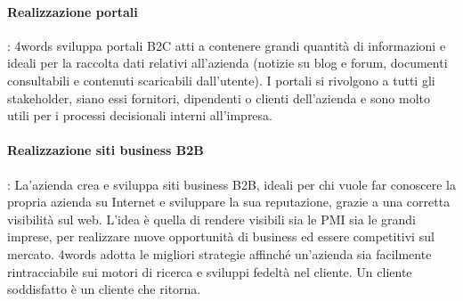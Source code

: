 \paragraph{Realizzazione portali}: 4words sviluppa portali B2C atti a contenere grandi quantità di informazioni e ideali per la raccolta dati relativi all'azienda (notizie su blog e forum, documenti consultabili e contenuti scaricabili dall'utente). I portali si rivolgono a tutti gli \gls{stakeholder}, siano essi fornitori, dipendenti o clienti dell'azienda e sono molto utili per i processi decisionali interni all'impresa.

\paragraph{Realizzazione siti business B2B}: La'azienda crea e sviluppa siti business B2B, ideali per chi vuole far conoscere la propria azienda su Internet e sviluppare la sua reputazione, grazie a una corretta visibilità sul web.
L'idea è quella di rendere visibili sia le PMI sia le grandi imprese, per realizzare nuove opportunità di business ed essere competitivi sul mercato. 4words adotta le migliori strategie affinché un'azienda sia facilmente rintracciabile sui motori di ricerca e sviluppi fedeltà nel cliente. Un cliente soddisfatto è un cliente che ritorna.
